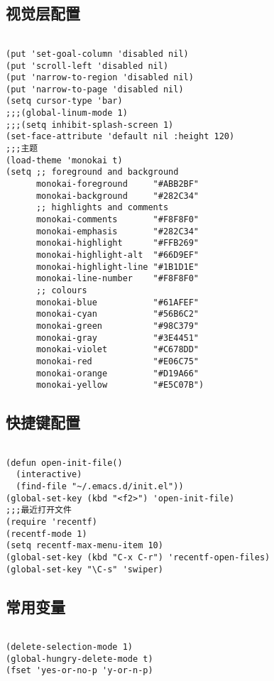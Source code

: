 \documentclass[11pt]{article}
\begin{document}
\subsection{视觉层配置}
\label{sec:orgef0ea4c}

\begin{verbatim}

(put 'set-goal-column 'disabled nil)
(put 'scroll-left 'disabled nil)
(put 'narrow-to-region 'disabled nil)
(put 'narrow-to-page 'disabled nil)
(setq cursor-type 'bar)
;;;(global-linum-mode 1)
;;;(setq inhibit-splash-screen 1)
(set-face-attribute 'default nil :height 120)
;;;主题
(load-theme 'monokai t)
(setq ;; foreground and background
      monokai-foreground     "#ABB2BF"
      monokai-background     "#282C34"
      ;; highlights and comments
      monokai-comments       "#F8F8F0"
      monokai-emphasis       "#282C34"
      monokai-highlight      "#FFB269"
      monokai-highlight-alt  "#66D9EF"
      monokai-highlight-line "#1B1D1E"
      monokai-line-number    "#F8F8F0"
      ;; colours
      monokai-blue           "#61AFEF"
      monokai-cyan           "#56B6C2"
      monokai-green          "#98C379"
      monokai-gray           "#3E4451"
      monokai-violet         "#C678DD"
      monokai-red            "#E06C75"
      monokai-orange         "#D19A66"
      monokai-yellow         "#E5C07B")

\end{verbatim}

\subsection{快捷键配置}
\label{sec:org50b9f8c}

\begin{verbatim}

(defun open-init-file()
  (interactive)
  (find-file "~/.emacs.d/init.el"))
(global-set-key (kbd "<f2>") 'open-init-file)
;;;最近打开文件
(require 'recentf)
(recentf-mode 1)
(setq recentf-max-menu-item 10)
(global-set-key (kbd "C-x C-r") 'recentf-open-files)
(global-set-key "\C-s" 'swiper)
\end{verbatim}

\subsection{常用变量}
\label{sec:org0ab26a7}

\begin{verbatim}

(delete-selection-mode 1)
(global-hungry-delete-mode t)
(fset 'yes-or-no-p 'y-or-n-p)

\end{verbatim}
\end{document}
